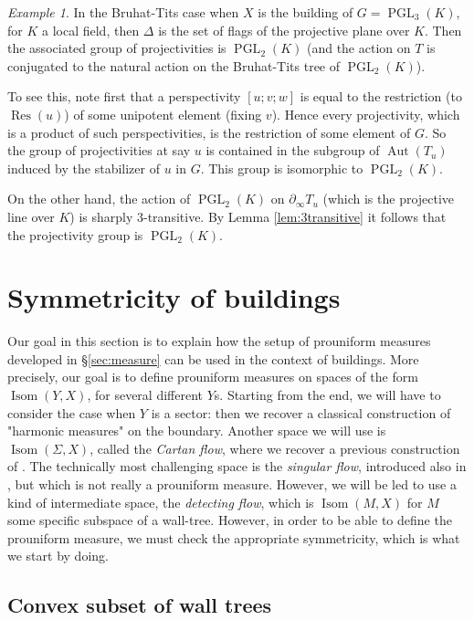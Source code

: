 \documentclass[a4paper, 11pt]{article}
\theoremstyle{plain}
\theoremstyle{definition}
\theoremstyle{remark}
\newtheorem{example}[proposition]{Example}
\DeclareMathOperator{\Aut}{Aut}
\DeclareMathOperator{\Res}{Res}
\DeclareMathOperator{\PGL}{PGL}
\DeclareMathOperator{\Isom}{Isom}
\begin{document}
\begin{example}
    In the Bruhat-Tits case when $X$ is the building of $G=\PGL_3(K)$, for $K$ a local field, then $\Delta$ is the set of flags of the projective plane over $K$. Then the associated group of projectivities is $\PGL_2(K)$ (and the action on $T$ is conjugated to the natural action on the Bruhat-Tits tree of $\PGL_2(K)$).

    To see this, note first that a perspectivity $[u;v;w]$ is equal to the restriction (to $\Res(u)$) of some unipotent element (fixing $v$). Hence every projectivity, which is a product of such perspectivities, is the restriction of some element of $G$. So the group of projectivities at say $u$ is contained in the subgroup of $\Aut(T_u)$ induced by the stabilizer of $u$ in $G$. This group is isomorphic to $\PGL_2(K)$.

    On the other hand, the action of $\PGL_2(K)$ on $\partial_\infty T_u$ (which is the projective line over $K$) is sharply 3-transitive.  By Lemma \ref{lem:3transitive} it follows that the projectivity group is $\PGL_2(K)$.
\end{example}

\section{Symmetricity of buildings} \label{sec:SoB}

Our goal in this section is to explain how the setup of prouniform measures developed in \S\ref{sec:measure} can be used in the context of buildings. More precisely, our goal is to define prouniform measures on spaces of the form $\Isom(Y,X)$, for several different $Y$s. Starting from the end, we will have to consider the case when $Y$ is a sector: then we recover a classical construction of "harmonic measures" on the boundary. Another space we will use is $\Isom(\Sigma, X)$, called the \emph{Cartan flow}, where we recover a previous construction of \cite{BCL}. The technically most challenging space is the \emph{singular flow}, introduced also in \cite{BCL}, but which is not really a prouniform measure. However, we will be led to use a kind of intermediate space, the \emph{detecting flow}, which is $\Isom(M,X)$ for $M$ some specific subspace of a wall-tree. However, in order to be able to define the prouniform measure, we must check the appropriate symmetricity, which is what we start by doing.

\subsection{Convex subset of wall trees}
\end{document}
